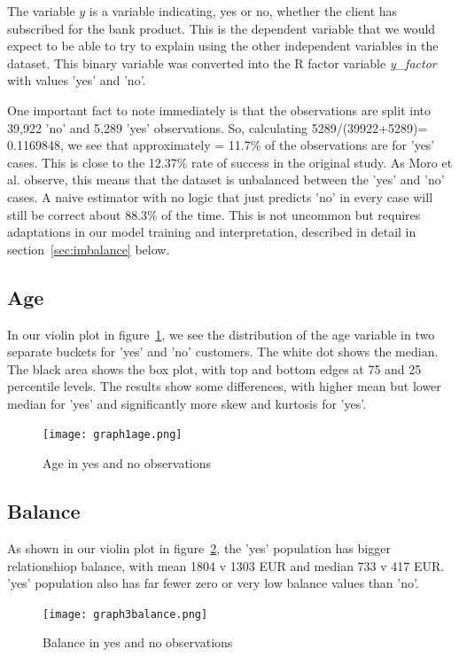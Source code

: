 \documentclass[9pt,technote]{IEEEtran}
\begin{document}
The variable $y$ is a variable indicating, yes or no, whether the client has subscribed for the bank product.  This is the dependent variable that we would expect to be able to try to explain using the other independent variables in the dataset.  This binary variable was converted into the R factor variable \textit{y\_factor} with values 'yes' and 'no'.  

One important fact to note immediately is that the observations are split into 39,922 'no' and 5,289 'yes' observations.  So, calculating 5289/(39922+5289)=  0.1169848, we see that approximately = 11.7\% of the observations are for 'yes' cases.  This is close to the 12.37\% rate of success in the original study\cite{moro14}.  As Moro et al. observe, this means that the dataset is unbalanced between the 'yes' and 'no' cases.  A naive estimator with no logic that just predicts 'no' in every case will still be correct about 88.3\% of the time.   This is not uncommon but requires adaptations in our model training and interpretation, described in detail in section~\ref{sec:imbalance} below.  

\subsection{Age}

In our violin plot in figure~\ref{fig:graph1age}, we see the distribution of the age variable in two separate buckets for 'yes' and 'no' customers.  The white dot shows the median.  The black area shows the box plot, with top and bottom edges at 75 and 25 percentile levels.  The results show some differences, with higher mean but lower median for 'yes' and significantly more skew and kurtosis for 'yes'.

\begin{figure}[htbp]
\centerline{\texttt{[image: graph1age.png]}}
\caption{Age in yes and no observations}
\label{fig:graph1age}
\end{figure}

\subsection{Balance}

As shown in our violin plot in figure~\ref{fig:graph3balance}, the 'yes' population has bigger relationshiop balance, with mean 1804 v 1303 EUR and median 733 v 417 EUR. 'yes' population also has far fewer zero or very low balance values than 'no'.  

\begin{figure}[htbp]
\centerline{\texttt{[image: graph3balance.png]}}
\caption{Balance in yes and no observations}
\label{fig:graph3balance}
\end{figure}
\end{document}
